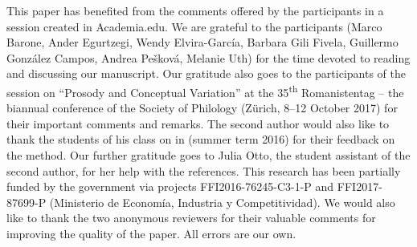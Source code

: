 \documentclass[output=paper]{LSP/langsci}
\begin{document}
This paper has benefited from the comments offered by the par\-ti\-ci\-pants in a session created in Academia.edu. We are grateful to the par\-ti\-ci\-pants (Marco Barone, Ander Egurtzegi, Wendy Elvira-García, Barbara Gili Fivela, Guillermo González Campos, Andrea Pešková, Melanie Uth) for the time devoted to reading and discussing our manuscript. Our gratitude also goes to the par\-ti\-ci\-pants of the session on “Prosody and Conceptual Variation” at the 35\textsuperscript{th} Romanistentag – the biannual conference of the  Society of  Philology (Zürich, 8--12 October 2017) for their important comments and remarks. The second author would also like to thank the students of his class on  in  (summer term 2016) for their feedback on the method. Our further gratitude goes to Julia Otto, the student assistant of the second author, for her help with the references. This research has been partially funded by the  government via projects FFI2016-76245-C3-1-P and FFI2017-87699-P (Ministerio de Economía, Industria y Competitividad). We would also like to thank the two anonymous reviewers for their valuable comments for improving the quality of the paper. All errors are our own.

{\sloppy
\printbibliography[heading=subbibliography,notkeyword=this]
}
\end{document}
